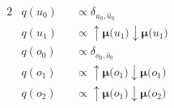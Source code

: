 \documentclass[fleqn]{article}
\begin{document}
\begin{minipage}[t]{0.5\textwidth}
\begin{alignat}{2}
         & q(u_0)                                                           &  & \propto \delta_{u_0,\hat{u}_0}                                                                                                                                                 \\
         & q(u_1)                                                           &  & \propto \bm{{\uparrow}{\mu}(}u_1\bm{)} \bm{{\downarrow}{\mu}(}u_1\bm{)}                                                                                                        \\
         & q(o_0)                                                           &  & \propto \delta_{o_0,\hat{o}_0}                                                                                                                                                 \\
         & q(o_1)                                                           &  & \propto \bm{{\uparrow}{\mu}(}o_1\bm{)} \bm{{\downarrow}{\mu}(}o_1\bm{)}                                                                                                        \\
         & q(o_2)                                                           &  & \propto \bm{{\uparrow}{\mu}(}o_1\bm{)} \bm{{\downarrow}{\mu}(}o_2\bm{)}
    \end{alignat}
\end{minipage}
\end{document}
